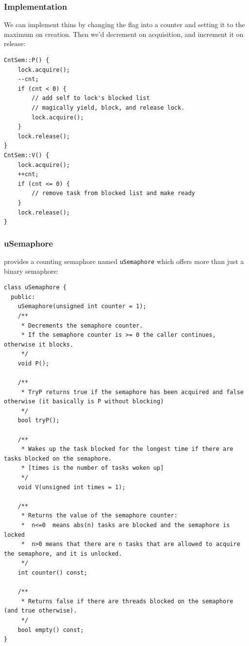                 \subsubsection{Implementation} %
                \label{ssub:implementation}
                    We can implement thins by changing the flag into a counter and setting it to the maximum on creation.
                    Then we'd decrement on acquisition, and increment it on release:
                    \begin{lstlisting}
CntSem::P() {
    lock.acquire();
    --cnt;
    if (cnt < 0) {
        // add self to lock's blocked list
        // magically yield, block, and release lock.
        lock.acquire();
    }
    lock.release();
}
CntSem::V() {
    lock.acquire();
    ++cnt;
    if (cnt <= 0) {
        // remove task from blocked list and make ready
    }
    lock.release();
}
                    \end{lstlisting}
                \subsubsection{uSemaphore} %
                \label{ssub:usemaphore}
                    \uC provides a counting semaphore named \verb|uSemaphore| which offers more than just a binary semaphore:
                    \begin{lstlisting}
class uSemaphore {
  public:
    uSemaphore(unsigned int counter = 1);
    /**
     * Decrements the semaphore counter.
     * If the semaphore counter is >= 0 the caller continues, otherwise it blocks.
     */
    void P();

    /**
     * TryP returns true if the semaphore has been acquired and false otherwise (it basically is P without blocking)
     */
    bool tryP();

    /**
     * Wakes up the task blocked for the longest time if there are tasks blocked on the semaphore.
     * [times is the number of tasks woken up]
     */
    void V(unsigned int times = 1);

    /**
     * Returns the value of the semaphore counter:
     *  n<=0  means abs(n) tasks are blocked and the semaphore is locked
     *  n>0 means that there are n tasks that are allowed to acquire the semaphore, and it is unlocked.
     */
    int counter() const;

    /**
     * Returns false if there are threads blocked on the semaphore (and true otherwise).
     */
    bool empty() const;
}
                    \end{lstlisting}
